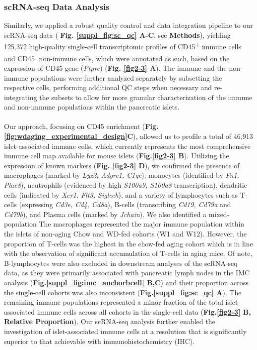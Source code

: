 \subsubsection{scRNA-seq Data Analysis}
Similarly, we applied a robust quality control and data integration pipeline to our scRNA-seq data ( \textbf{Fig. \ref{suppl_fig:sc_qc} A-C}, see \textbf{Methods}), yielding 125,372 high-quality single-cell transcriptomic profiles of CD45\textsuperscript{+} immune cells and CD45\textsuperscript{-} non-immune cells, which were annotated as such, based on the expression of CD45 gene (\textit{Ptprc}) (\textbf{Fig. \ref{fig2-3} A}). The immune and the non-immune populations were further analyzed separately by subsetting the respective cells, performing additional QC steps when necessary and re-integrating the subsets to allow for more granular characterization of the immune and non-immune populations within the pancreatic islets.\\\\
Our approach, focusing on CD45 enrichment  (\textbf{Fig.\ref{fig:wdaging_experimental_design}C}), allowed us to profile a total of 46,913 islet-associated immune cells, which currently represents the most comprehensive immune cell map available for mouse islets (\textbf{Fig.\ref{fig2-3} B}). Utilizing the expression of known markers (\textbf{Fig. \ref{fig2-3} D}), we confirmed the presence of macrophages (marked by \textit{Lyz2, Adgre1, C1qc}), monocytes (identified by \textit{Fn1, Plac8}), neutrophils (evidenced by high \textit{S100a9, S100a8} transcription), dendritic cells (indicated by \textit{Xcr1, Flt3, Siglech}), and a variety of lymphocytes such as T-cells (expressing \textit{Cd3e, Cd4, Cd8a}), B-cells (transcribing \textit{Cd19, Cd79a} and \textit{Cd79b}), and Plasma cells (marked by \textit{Jchain}). We also identified a mixed-population The macrophages represented the major immune population within the islets of non-aging Chow and WD-fed cohorts (W1 and W12). However, the proportion of T-cells was the highest in the chow-fed aging cohort which is in line with the observation of significant accumulation of T-cells in aging mice. Of note, B-lymphocytes were also excluded in downstream analyses of the scRNA-seq data, as they were primarily associated with pancreatic lymph nodes in the IMC analysis (\textbf{Fig.\ref{suppl_fig:imc_anchorbcell} B,C}) and their proportion across the single-cell cohorts was also inconsistent (\textbf{Fig.\ref{suppl_fig:sc_qc} A}). The remaining immune populations represented a minor fraction of the total islet-associated immune cells across all cohorts in the single-cell data (\textbf{Fig.\ref{fig2-3} B, Relative Proportion}). Our scRNA-seq analysis further enabled the investigation of islet-associated immune cells at a resolution that is significantly superior to that achievable with immunohistochemistry (IHC).\\\\
